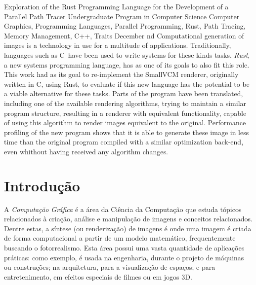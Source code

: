 \documentclass[tg]{mdtufsm}
\def\Cpp{{C\nolinebreak[4]\raisebox{.20ex}{\small\bf++}}}
\begin{document}
\begin{englishabstract}
{Exploration of the Rust Programming Language for the Development of a Parallel Path Tracer}
{Undergraduate Program in Computer Science}
{Computer Graphics, Programming Languages, Parallel Programming, Rust, Path Tracing, Memory Management, C++, Traits}
{December}
{nd}
Computational generation of images is a technology in use for a multitude of applications.
Traditionally, languages such as \Cpp\ have been used to write systems for these kinds tasks.
\emph{Rust}, a new systems programming language, has as one of its goals to also fit this role. This
work had as its goal to re-implement the SmallVCM renderer, originally written in \Cpp, using Rust,
to evaluate if this new language has the potential to be a viable alternative for these tasks. Parts of
the program have been translated, including one of the available rendering algorithms, trying to
maintain a similar program structure, resulting in a renderer with equivalent functionality, capable
of using this algorithm to render images equivalent to the original. Performance profiling of the new
program shows that it is able to generate these image in less time than the original program compiled
with a similar optimization back-end, even whithout having received any algorithm changes.
\end{englishabstract}

\tableofcontents
\listoffigures
\listoftables

\setlength{\baselineskip}{1.5\baselineskip}


\chapter{Introdução}

A \emph{Computação Gráfica} é a área da Ciência da Computação que estuda tópicos relacionados à
criação, análise e manipulação de imagens e conceitos relacionados. Dentre estas, a síntese (ou
renderização) de imagens é onde uma imagem é criada de forma computacional a partir de um modelo
matemático, frequentemente buscando o fotorrealismo. Esta área possui uma vasta quantidade de aplicações
práticas: como exemplo, é usada na engenharia, durante o projeto de máquinas ou construções; na arquitetura, para
a visualização de espaços; e para entretenimento, em efeitos especiais de filmes ou em jogos 3D.
\end{document}
